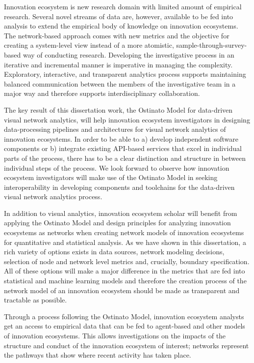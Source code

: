 Innovation ecosystem is new research domain with limited amount of empirical research. Several novel streams of data are, however, available to be fed into analysis to extend the empirical body of knowledge on innovation ecosystems. The network-based approach comes with new metrics and the objective for creating a system-level view instead of a more atomistic, sample-through-survey-based way of conducting research. Developing the investigative process in an iterative and incremental manner is imperative in managing the complexity. Exploratory, interactive, and transparent analytics process supports  maintaining balanced communication between the members of the investigative team in a major way and therefore supports interdisciplinary collaboration. 

The key result of this dissertation work, the Ostinato Model for data-driven visual network analytics, will help innovation ecosystem investigators in designing data-processing pipelines and architectures for visual network analytics of innovation ecosystems. In order to be able to a) develop independent software components or b) integrate existing API-based services that excel in individual parts of the process, there has to be a clear distinction and structure in between individual steps of the process. We look forward to observe how innovation ecosystem investigators will make use of the Ostinato Model in seeking interoperability in developing components and toolchains for the data-driven visual network analytics process.

In addition to visual analytics, innovation ecosystem scholar will benefit from applying the Ostinato Model and design principles for analyzing innovation ecosystems as networks when creating network models of innovation ecosystems for quantitative and statistical analysis. As we have shown in this dissertation, a rich variety of options exists in data sources, network modeling decisions, selection of node and network level metrics and, crucially, boundary specification. All of these options will make a major difference in the metrics that are fed into statistical and machine learning models and therefore the creation process of the network model of an innovation ecosystem should be made as transparent and tractable as possible. 

Through a process following the Ostinato Model, innovation ecosystem analysts get an access to empirical data that can be fed to agent-based and other models of innovation ecosystems. This allows investigations on the impacts of the structure and conduct \citep{Afuah2013,Ahuja2012TheNetworks} of the innovation ecosystem of interest; networks represent the pathways that show where recent activity has taken place.

